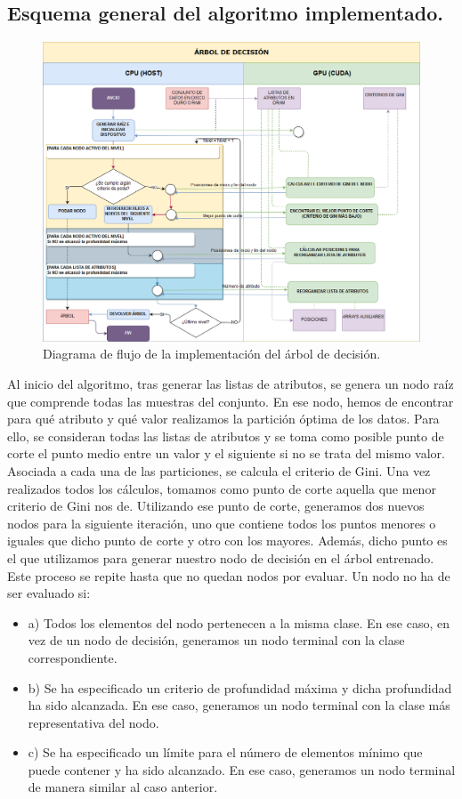 \subsection{Esquema general del algoritmo implementado.}
\begin{figure}[ht]
\centering
\includegraphics[scale=0.35]{imagenes/esquemadtree.png}
\caption{Diagrama de flujo de la implementación del árbol de decisión.}
\label{img:dtree}
\end{figure}
Al inicio del algoritmo, tras generar las listas de atributos, se genera un nodo raíz que comprende todas las muestras del conjunto. En ese nodo, hemos de encontrar para qué atributo y qué valor realizamos la partición óptima de los datos. Para ello, se consideran todas las listas de atributos y se toma como posible punto de corte el punto medio entre un valor y el siguiente si no se trata del mismo valor. Asociada a cada una de las particiones, se calcula el criterio de Gini. Una vez realizados todos los cálculos, tomamos como punto de corte aquella que menor criterio de Gini nos de. Utilizando ese punto de corte, generamos dos nuevos nodos para la siguiente iteración, uno que contiene todos los puntos menores o iguales que dicho punto de corte y otro con los mayores. Además, dicho punto es el que utilizamos para generar nuestro nodo de decisión en el árbol entrenado.  Este proceso se repite hasta que no quedan nodos por evaluar. Un nodo no ha de ser evaluado si:\\

\begin{itemize}
    \item a) Todos los elementos del nodo pertenecen a la misma clase. En ese caso, en vez de un nodo de decisión, generamos un nodo terminal con la clase correspondiente.
    \item b) Se ha especificado un criterio de profundidad máxima y dicha profundidad ha sido alcanzada. En ese caso, generamos un nodo terminal con la clase más representativa del nodo.
    \item c) Se ha especificado un límite para el número de elementos mínimo que puede contener y ha sido alcanzado. En ese caso, generamos un nodo terminal de manera similar al caso anterior.
\end{itemize}



